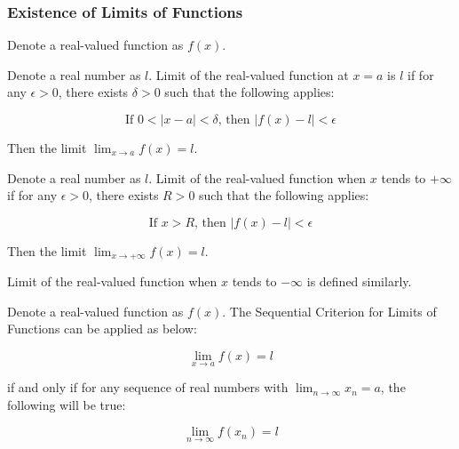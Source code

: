 \subsubsection{Existence of Limits of Functions}
\begin{thm}
  Denote a real-valued function as $f(x)$.
  \begin{alist}
    \item Denote a real number as $l$. Limit of the real-valued function at $x=a$ is $l$ if for any $\epsilon>0$, there exists $\delta>0$ such that the following applies:

    $$\text{If }0<\left| x-a\right| <\delta\text{, then }\left| f(x)-l\right| <\epsilon$$\s

    Then the limit $\lim_{x\to a}f(x)=l$.
    \item Denote a real number as $l$. Limit of the real-valued function when $x$ tends to $+\infty$ if for any $\epsilon>0$, there exists $R>0$ such that the following applies:

    $$\text{If }x>R\text{, then }\left| f(x)-l\right| <\epsilon$$\s

    Then the limit $\lim_{x\to +\infty}f(x)=l$.
  \end{alist}
\end{thm}\n

Limit of the real-valued function when $x$ tends to $-\infty$ is defined similarly.\n

\begin{thm}
  Denote a real-valued function as $f(x)$. The Sequential Criterion for Limits of Functions can be applied as below:

  $$\lim_{x\to a}f(x)=l$$\s

  if and only if for any sequence of real numbers with $\lim_{n\to \infty}x_{n}=a$, the following will be true:

  $$\lim_{n\to \infty}f(x_{n})=l$$
\end{thm}

